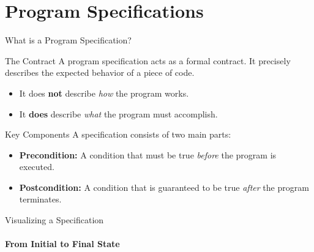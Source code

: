 \section{Program Specifications}

\begin{frame}{What is a Program Specification?}
    \begin{block}{The Contract}
        A program specification acts as a formal contract. It precisely describes the expected behavior of a piece of code.
        \begin{itemize}
            \item It does \textbf{not} describe \emph{how} the program works.
            \item It \textbf{does} describe \emph{what} the program must accomplish.
        \end{itemize}
    \end{block}
    \begin{block}{Key Components}
        A specification consists of two main parts:
        \begin{itemize}
            \item \textbf{Precondition:} A condition that must be true \emph{before} the program is executed.
            \item \textbf{Postcondition:} A condition that is guaranteed to be true \emph{after} the program terminates.
        \end{itemize}
    \end{block}
\end{frame}

\begin{frame}{Visualizing a Specification}
    \framesubtitle{From Initial to Final State}
    \begin{center}
    \end{center}
\end{frame}